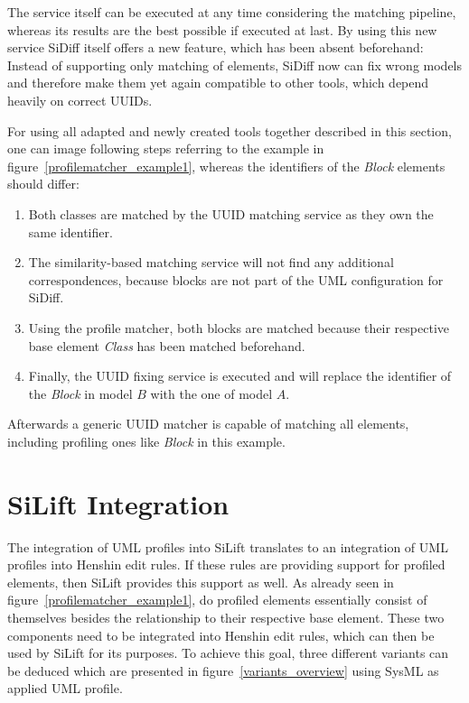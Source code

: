 The service itself can be executed at any time considering the matching
pipeline, whereas its results are the best possible if executed at last.
By using this new service SiDiff itself offers a new feature, which has been
absent beforehand: Instead of supporting only matching of elements, SiDiff now
can fix wrong models and therefore make them yet again compatible to other
tools, which depend heavily on correct \ac{UUID}s.

For using all adapted and newly created tools together described in this section,
one can image following steps referring to the example in
figure~\ref{profilematcher_example1}, whereas the identifiers of the
\textit{Block} elements should differ:
\begin{enumerate}
  \item Both classes are matched by the \ac{UUID} matching service as they own
  the same identifier.
  \item The similarity-based matching service will not find any additional
  correspondences, because blocks are not part of the \ac{UML} configuration for
  SiDiff.
  \item Using the profile matcher, both blocks are matched because their
  respective base element \textit{Class} has been matched beforehand.
  \item Finally, the \ac{UUID} fixing service is executed and will replace the
  identifier of the \textit{Block} in model $B$ with the one of model $A$.
\end{enumerate}
Afterwards a generic \ac{UUID} matcher is capable of matching all elements,
including profiling ones like \textit{Block} in this example.
\section{SiLift Integration}\label{Integration:silift}
The integration of \ac{UML} profiles into SiLift translates to an integration
of \ac{UML} profiles into Henshin edit rules. If these rules are providing
support for profiled elements, then SiLift provides this support as well.
As already seen in figure~\ref{profilematcher_example1}, do profiled elements
essentially consist of themselves besides the relationship to their respective
base element. These two components need to be integrated into Henshin edit
rules, which can then be used by SiLift for its purposes. To achieve this goal,
three different variants can be deduced which are presented in
figure~\ref{variants_overview} using \ac{SysML} as applied \ac{UML} profile.


